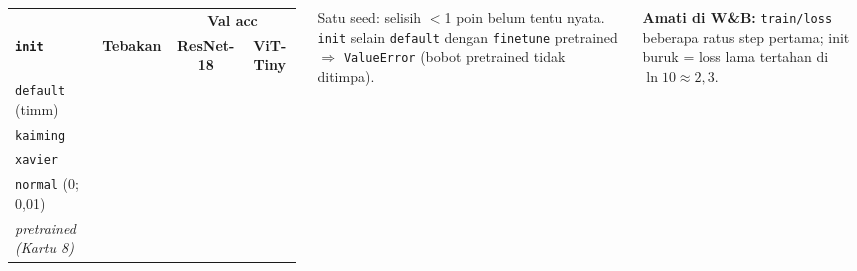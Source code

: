 \documentclass[t,aspectratio=169,xcolor={dvipsnames,table}]{beamer}
\newcommand{\con}[1]{\textcolor{dlOrange}{#1}}
\begin{document}
\begin{frame}
\begin{columns}[T]
        \vspace{2pt}
        \scriptsize
        \setlength{\tabcolsep}{4pt}
        \renewcommand{\arraystretch}{1.35}
        \begin{tabular}{|l|c|c|c|}
            \rowcolor{dlSoftCloud} & & \multicolumn{2}{c|}{\textbf{Val acc}} \\
            \rowcolor{dlSoftCloud} \textbf{\texttt{init}} & \textbf{Tebakan} & \textbf{ResNet-18} & \textbf{ViT-Tiny} \\ \hline
            \texttt{default} (timm) & \hspace{0.75cm} & \hspace{0.75cm} & \hspace{0.75cm} \\ \hline
            \texttt{kaiming} & \hspace{0.75cm} & \hspace{0.75cm} & \hspace{0.75cm} \\ \hline
            \texttt{xavier} & \hspace{0.75cm} & \hspace{0.75cm} & \hspace{0.75cm} \\ \hline
            \texttt{normal} (0; 0,01) & \hspace{0.75cm} & \hspace{0.75cm} & \hspace{0.75cm} \\ \hline
            \textit{pretrained (Kartu 8)} & \hspace{0.75cm} & \hspace{0.75cm} & \hspace{0.75cm} \\ \hline
        \end{tabular}

        \vspace{0.12cm}
        {\scriptsize Satu seed: selisih $<$1 poin \con{belum tentu nyata}. \texttt{init} selain \texttt{default} dengan \texttt{finetune} pretrained $\Rightarrow$ \texttt{ValueError} (bobot pretrained tidak ditimpa).}

        \vspace{0.1cm}
        {\scriptsize\color{dlMute} \textbf{Amati di W\&B:} \texttt{train/loss} beberapa ratus step pertama; init buruk = loss lama tertahan di $\ln 10 \approx 2{,}3$.}
    \end{columns}
\end{frame}
\end{document}
